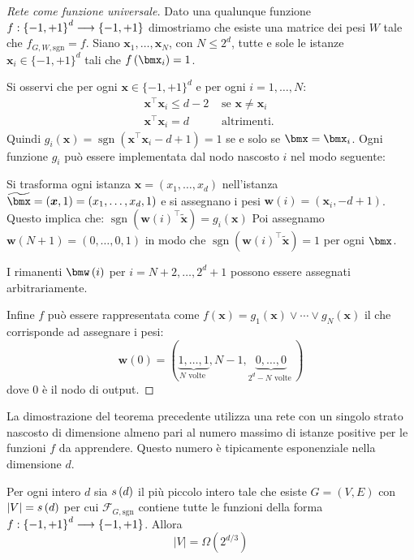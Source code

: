 \documentclass[\main/main.tex]{subfiles}
\begin{document}
\begin{multicols}{2}
\begin{proof}[Rete come funzione universale]
    Dato una qualunque funzione \(f:\left\{-1, +1\right\}^d\longrightarrow \left\{-1, +1\right\}\) dimostriamo che esiste una matrice dei pesi \(W\) tale che \(f_{G, W, \mathrm{sgn}}=f\). Siano \(\boldsymbol{x}_{1}, \dots, \boldsymbol{x}_{N}\), con \(N \leq 2^d\), tutte e sole le istanze \(\boldsymbol{x}_{i} \in\{-1,+1\}^{d}\) tali che \(f\rnd{\bmx_i} = 1\).
    
    Si osservi che per ogni \(\boldsymbol{x} \in\{-1,+1\}^{d}\) e per ogni \(i=1, \ldots, N\):
    \begin{align*}
        \boldsymbol{x}^{\top} \boldsymbol{x}_{i} \leq d-2 & \text { se } \boldsymbol{x} \neq \boldsymbol{x}_{i} \\
        \boldsymbol{x}^{\top} \boldsymbol{x}_{i}=d & {\text { altrimenti. }}
    \end{align*}
    Quindi \(g_{i}(\boldsymbol{x})=\operatorname{sgn}\left(\boldsymbol{x}^{\top} \boldsymbol{x}_{i}-d+1\right)=1\) se e solo se \(\bmx = \bmx_i\). Ogni funzione \(g_i\) può essere implementata dal nodo nascosto \(i\) nel modo seguente:
    
    Si trasforma ogni istanza \(\boldsymbol{x}=\left(x_{1}, \dots, x_{d}\right)\) nell'istanza \(\tilde{\bmx} = (\boldsymbol{x}, 1)=\left(x_{1}, \dots, x_{d}, 1\right)\) e si assegnano i pesi \(\boldsymbol{w}(i)=\left(\boldsymbol{x}_{i},-d+1\right)\). Questo implica che:
    \(\operatorname{sgn}\left(\boldsymbol{w}(i)^{\top} \widetilde{\boldsymbol{x}}\right)=g_{i}(\boldsymbol{x})\)
    Poi assegnamo \(\boldsymbol{w}(N+1)=(0, \dots, 0,1)\) in modo che \(\operatorname{sgn}\left(\boldsymbol{w}(i)^{\top} \widetilde{\boldsymbol{x}}\right)=1\) per ogni \(\bmx\).
    
    I rimanenti \(\bmw\rnd{i}\) per \(i=N+2, \ldots, 2^{d}+1\) possono essere assegnati arbitrariamente.
    
    Infine \(f\) può essere rappresentata come \(f(\boldsymbol{x})=g_{1}(\boldsymbol{x}) \vee \cdots \vee g_{N}(\boldsymbol{x})\) il che corrisponde ad assegnare i pesi:
    \[\boldsymbol{w}(0)=\left(\underbrace{1, \ldots, 1}_{N \text { volte }}, N-1, \underbrace{0, \ldots, 0}_{2^{d}-N \text { volte }}\right)\]
    dove \(0\) è il nodo di output.
\end{proof}
\begin{observation}
    La dimostrazione del teorema precedente utilizza una rete con un singolo strato nascosto di dimensione almeno pari al numero massimo di istanze positive per le funzioni \(f\) da apprendere. Questo numero è tipicamente esponenziale nella dimensione \(d\).
\end{observation}
\begin{theorem}
    Per ogni intero \(d\) sia \(s\left(d\right)\) il più piccolo intero tale che esiste \(G=(V, E)\) con \(\left\lvert V\right\rvert = s\left(d\right)\) per cui \(\mathcal{F}_{G, \mathrm{sgn}}\) contiene tutte le funzioni della forma \(f:\left\{-1, +1\right\}^d\longrightarrow \left\{-1, +1\right\}\). Allora \[|V|=\Omega\left(2^{d / 3}\right)\]
    

\end{theorem}
\end{multicols}
\end{document}
